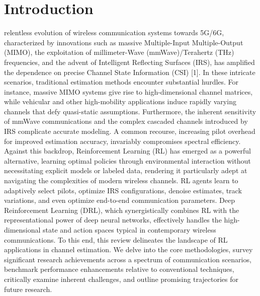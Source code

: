 \documentclass[journal,twocolumn]{IEEEtran}
\begin{document}
%
\IEEEpeerreviewmaketitle



\section{Introduction}

 relentless evolution of wireless communication systems towards 5G/6G, characterized by innovations such as massive Multiple-Input Multiple-Output (MIMO), the exploitation of millimeter-Wave (mmWave)/Terahertz (THz) frequencies, and the advent of Intelligent Reflecting Surfaces (IRS), has amplified the dependence on precise Channel State Information (CSI) [1]. In these intricate scenarios, traditional estimation methods encounter substantial hurdles. For instance, massive MIMO systems give rise to high-dimensional channel matrices, while vehicular and other high-mobility applications induce rapidly varying channels that defy quasi-static assumptions. Furthermore, the inherent sensitivity of mmWave communications and the complex cascaded channels introduced by IRS complicate accurate modeling. A common recourse, increasing pilot overhead for improved estimation accuracy, invariably compromises spectral efficiency. Against this backdrop, Reinforcement Learning (RL) has emerged as a powerful alternative, learning optimal policies through environmental interaction without necessitating explicit models or labeled data, rendering it particularly adept at navigating the complexities of modern wireless channels. RL agents learn to adaptively select pilots, optimize IRS configurations, denoise estimates, track variations, and even optimize end-to-end communication parameters. Deep Reinforcement Learning (DRL), which synergistically combines RL with the representational power of deep neural networks, effectively handles the high-dimensional state and action spaces typical in contemporary wireless communications. To this end, this review delineates the landscape of RL applications in channel estimation. We delve into the core methodologies, survey significant research achievements across a spectrum of communication scenarios, benchmark performance enhancements relative to conventional techniques, critically examine inherent challenges, and outline promising trajectories for future research.
\end{document}

